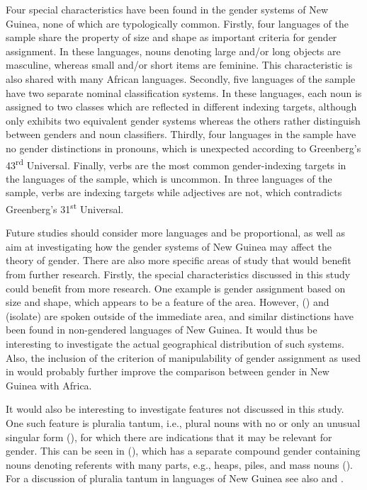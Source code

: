 \documentclass[output=collectionpaper]{langsci/langscibook}
\begin{document}
Four special characteristics have been found in the gender systems of New Guinea, none of which are typologically common. Firstly, four languages of the sample share the property of size and shape as important criteria for gender assignment. In these languages, nouns denoting large and/or long objects are masculine, whereas small and/or short items are feminine. This characteristic is also shared with many African languages. Secondly, five languages of the sample have two separate nominal classification systems. In these languages, each noun is assigned to two classes which are reflected in different indexing targets, although only  exhibits two equivalent gender systems whereas the others rather distinguish between genders and noun classifiers. Thirdly, four languages in the sample have no gender distinctions in pronouns, which is unexpected according to Greenberg's 43\textsuperscript{rd} Universal. Finally, verbs are the most common gender-indexing targets in the languages of the sample, which is uncommon. In three languages of the sample, verbs are indexing targets while adjectives are not, which contradicts Greenberg's 31\textsuperscript{st} Universal.


Future studies should consider more languages and be proportional, as well as aim at investigating how the gender systems of New Guinea may affect the theory of gender. There are also more specific areas of study that would benefit from further research. Firstly, the special characteristics discussed in this study could benefit from more research. One example is gender assignment based on size and shape, which appears to be a feature of the  area. However,  () and  (isolate) are spoken outside of the immediate area, and similar distinctions have been found in non-gendered languages of New Guinea. It would thus be interesting to investigate the actual geographical distribution of such systems. Also, the inclusion of the criterion of manipulability of gender assignment as used in \citet{DiGarbo2014} would probably further improve the comparison between gender in New Guinea with Africa.



It would also be interesting to investigate features not discussed in this study. One such feature is pluralia tantum, i.e., plural nouns with no or only an unusual singular form (\citealt[629]{Koptjevskaja-Tamm2001}), for which there are indications that it may be relevant for gender. This can be seen in  (), which has a separate compound gender containing nouns denoting referents with many parts, e.g., heaps, piles, and mass nouns (\citealt[68]{Arsjoe1999}). For a discussion of pluralia tantum in languages of New Guinea see also  and .
\end{document}
